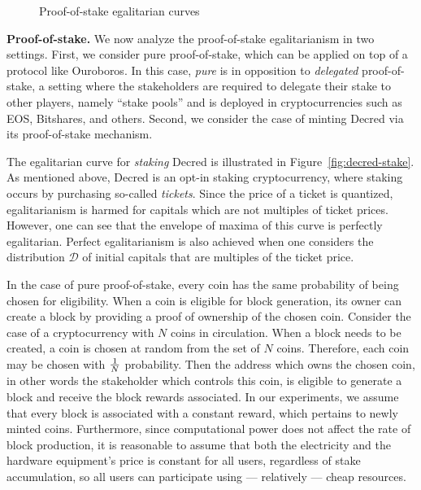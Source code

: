 \begin{figure}
  \caption{Proof-of-stake egalitarian curves}
  \label{fig:egalitarian_curves_pos}
\end{figure}

\noindent\textbf{Proof-of-stake.}
\noindent
We now analyze the proof-of-stake egalitarianism in two settings. First, we
consider pure proof-of-stake, which can be applied on top of a protocol like
Ouroboros. In this case, \emph{pure} is in opposition to \emph{delegated}
proof-of-stake, a setting where the stakeholders are required to delegate their
stake to other players, namely ``stake pools'' and is deployed in
cryptocurrencies such as EOS, Bitshares, and others. Second, we consider the
case of minting Decred via its proof-of-stake mechanism.

The egalitarian curve for \emph{staking} Decred is illustrated in
Figure~\ref{fig:decred-stake}.
As mentioned above, Decred is an opt-in staking cryptocurrency, where staking
occurs by purchasing so-called \emph{tickets}. Since the price of a ticket is
quantized, egalitarianism is harmed for capitals which are not multiples of
ticket prices. However, one can see that the envelope of maxima of this curve
is perfectly egalitarian. Perfect egalitarianism is also achieved when one
considers the distribution $\mathcal{D}$ of initial capitals that are multiples
of the ticket price.

In the case of pure proof-of-stake, every coin has the same probability of
being chosen for eligibility. When a coin is eligible for block generation, its
owner can create a block by providing a proof of ownership of the chosen coin.
Consider the case of a cryptocurrency with $N$ coins in circulation. When a
block needs to be created, a coin is chosen at random from the set of $N$
coins. Therefore, each coin may be chosen with $1 \over N$ probability. Then
the address which owns the chosen coin, in other words the stakeholder which
controls this coin, is eligible to generate a block and receive the block
rewards associated. In our experiments, we assume that every block is
associated with a constant reward, which pertains to newly minted coins.
Furthermore, since computational power does not affect the rate of block
production, it is reasonable to assume that both the electricity and the
hardware equipment's price is constant for all users, regardless of stake
accumulation, so all users can participate using --- relatively --- cheap
resources.

